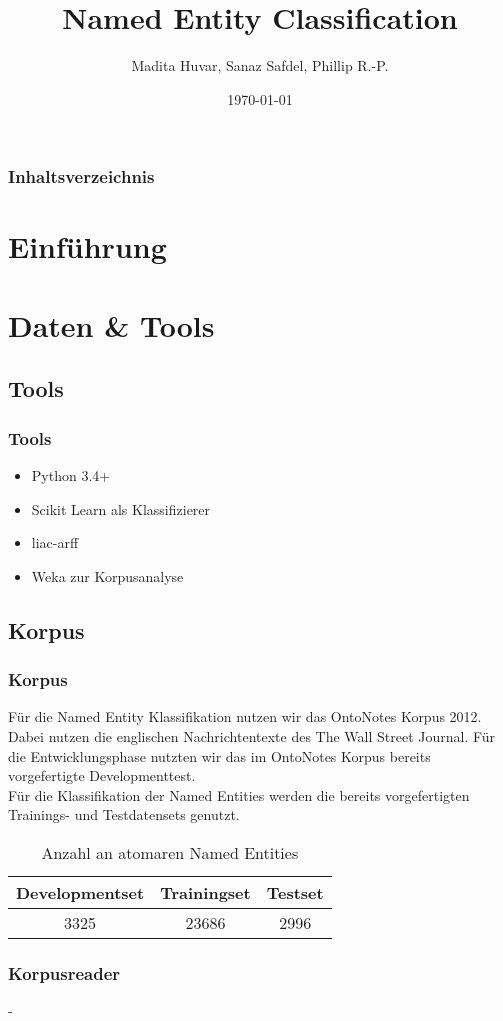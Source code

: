 \documentclass{beamer}
\title{Named Entity Classification}
\author{Madita Huvar, Sanaz Safdel, Phillip R.-P.}
\date{\today}
\begin{document}
\begin{frame}
\titlepage
\end{frame} 

\begin{frame}
\frametitle{Inhaltsverzeichnis}
\tableofcontents
\end{frame} 


\section{Einführung}
\section{Daten \& Tools}
	\subsection{Tools}
	\begin{frame}
			\frametitle{Tools}
			\begin{itemize}
				\item Python 3.4+
				\item Scikit Learn als Klassifizierer
				\item liac-arff
				\item Weka zur Korpusanalyse
			\end{itemize}
	\end{frame}
	\subsection{Korpus}
	\begin{frame}
			\frametitle{Korpus}
			Für die Named Entity Klassifikation nutzen wir das OntoNotes Korpus 2012.\\
			
			Dabei nutzen die englischen Nachrichtentexte des The Wall Street Journal.
			Für die Entwicklungsphase nutzten wir das im OntoNotes Korpus bereits vorgefertigte Developmenttest.\\
			
			Für die Klassifikation der Named Entities werden die bereits vorgefertigten Trainings- und Testdatensets genutzt.\\
			 \begin{table}
			 	\caption{Anzahl an atomaren Named Entities}
			 	\begin{tabular}{ccc}
			 		\toprule
					Developmentset & Trainingset & Testset\\
			 		\midrule
					3325 & 23686 & 2996\\
			 		\bottomrule
			 	\end{tabular}
			 	\label{tab:datasets}
			 \end{table}
	\end{frame}
		\begin{frame}
			\frametitle{Korpusreader}
			-
		\end{frame}
	
\end{document}
